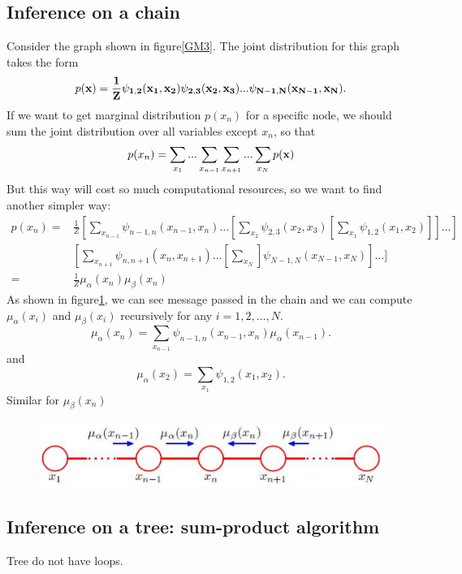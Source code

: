 \documentclass[a4paper]{book}
\begin{document}
\subsection{Inference on a chain}
Consider the graph shown in figure\ref{GM3}. The joint distribution for this graph takes the form
\begin{equation}\label{eq8.16}
  p(\bf x) = \frac{1}{Z}\psi_{1,2}(x_1,x_2)\psi_{2,3}(x_2,x_3)...\psi_{N-1,N}(x_{N-1},x_N).
\end{equation}
If we want to get marginal distribution $p(x_n)$ for a specific node, we should sum the joint distribution over all variables except $x_n$, so that
\begin{equation}\label{eq8.17}
  p(x_n) = \sum_{x_1}...\sum_{x_{n-1}}\sum_{x_{n+1}}...\sum_{x_N}p(\bf x)
\end{equation}
But this way will cost so much computational resources, so we want to find another simpler way:
\begin{align}\label{eq8.18}
  p(x_n) =  & \frac{1}{Z}[\sum_{x_{n-1}}\psi_{n-1,n}(x_{n-1},x_n)\dots[\sum_{x_2}\psi_{2,3}(x_2,x_3)[\sum_{x_1}\psi_{1,2}(x_1,x_2)]]\dots] \\
   & [\sum_{x_{n+1}}\psi_{n,n+1}(x_n,x_{n+1})\dots[\sum_{x_N}]\psi_{N-1,N}(x_{N-1},x_{N})]\dots]  \\
   = & \frac{1}{Z}\mu_{\alpha}(x_n)\mu_{\beta}(x_n)
\end{align}
As shown in figure\ref{GM4}, we can see message passed in the chain and we can compute $\mu_{\alpha}(x_i)$ and $\mu_{\beta}(x_i)$ recursively for any $i=1, 2, \dots, N$.
\begin{equation}\label{eq8.19}
  \mu_{\alpha}(x_n) = \sum_{x_{n-1}}\psi_{n-1,n}(x_{n-1},x_n)\mu_{\alpha}(x_{n-1}).
\end{equation}
and
\begin{equation}\label{eq8.20}
  \mu_{\alpha}(x_2) = \sum_{x_1}\psi_{1,2}(x_1,x_2).
\end{equation}
Similar for $\mu_{\beta}(x_n)$
\begin{figure}[bth]
  \centering
  \includegraphics[width=\textwidth]{./imgs/GM4.eps}
  \caption{}\label{GM4}
\end{figure}
\subsection{Inference on a tree: sum-product algorithm}
Tree do not have loops.
\end{document}
